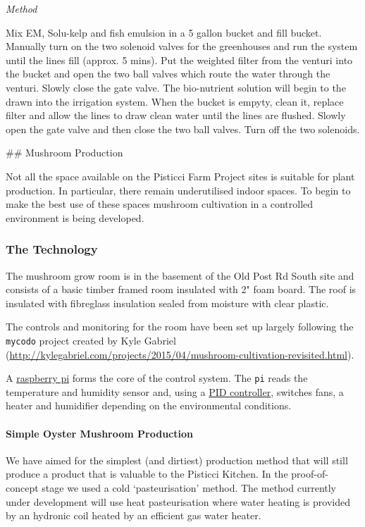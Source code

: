 \emph{Method}

Mix EM, Solu-kelp and fish emulsion in a 5 gallon bucket and fill
bucket. Manually turn on the two solenoid valves for the greenhouses and
run the system until the lines fill (approx. 5 mins). Put the weighted
filter from the venturi into the bucket and open the two ball valves
which route the water through the venturi. Slowly close the gate valve.
The bio-nutrient solution will begin to the drawn into the irrigation
system. When the bucket is empyty, clean it, replace filter and allow
the lines to draw clean water until the lines are flushed. Slowly open
the gate valve and then close the two ball valves. Turn off the two
solenoids.

 \#\# Mushroom Production

Not all the space available on the Pisticci Farm Project sites is
suitable for plant production. In particular, there remain underutilised
indoor spaces. To begin to make the best use of these spaces mushroom
cultivation in a controlled environment is being developed.

\subsubsection{The Technology}\label{the-technology}

The mushroom grow room is in the basement of the Old Post Rd South site
and consists of a basic timber framed room insulated with 2" foam board.
The roof is insulated with fibreglass insulation sealed from moisture
with clear plastic.

The controls and monitoring for the room have been set up largely
following the \texttt{mycodo} project created by Kyle Gabriel
(\url{http://kylegabriel.com/projects/2015/04/mushroom-cultivation-revisited.html}).

A
\href{https://www.raspberrypi.org/products/raspberry-pi-2-model-b/}{raspberry
pi} forms the core of the control system. The \texttt{pi} reads the
temperature and humidity sensor and, using a
\href{http://www.csimn.com/CSI_pages/PIDforDummies.html}{PID
controller}, switches fans, a heater and humidifier depending on the
environmental conditions.

\paragraph{Simple Oyster Mushroom
Production}\label{simple-oyster-mushroom-production}

We have aimed for the simplest (and dirtiest) production method that
will still produce a product that is valuable to the Pisticci Kitchen.
In the proof-of-concept stage we used a cold `pasteurisation' method.
The method currently under development will use heat pasteurisation
where water heating is provided by an hydronic coil heated by an
efficient gas water heater.


